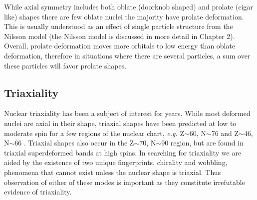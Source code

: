 While axial symmetry includes both oblate (doorknob shaped) and prolate (cigar like) shapes there are few oblate nuclei the majority have prolate deformation. This is usually understood as an effect of single particle structure from the Nilsson model (the Nilsson model is discussed in more detail in Chapter 2). Overall, prolate deformation moves more orbitals to low energy than oblate deformation, therefore in situations where there are several particles, a sum over these particles will favor prolate shapes.

\subsection{Triaxiality}
\label{ssec:intro-rot-triax}
Nuclear triaxiality has been a subject of interest for years. While most deformed nuclei are axial in their shape, triaxial shapes have been predicted at low to moderate spin for a few regions of the nuclear chart, \emph{e.g.} Z$\sim{}$60, N$\sim{}$76 and Z$\sim{}$46, N$\sim{}$66 \cite{groundStateTriax}. Triaxial shapes also occur in the Z$\sim{}$70, N$\sim{}$90 region, but are found in triaxial superdeformed bands at high spins. In searching for triaxiality we are aided by the existence of two unique fingerprints, chirality and wobbling, phenomena that cannot exist unless the nuclear shape is triaxial. Thus observation of either of these modes is important as they constitute irrefutable evidence of triaxiality.



